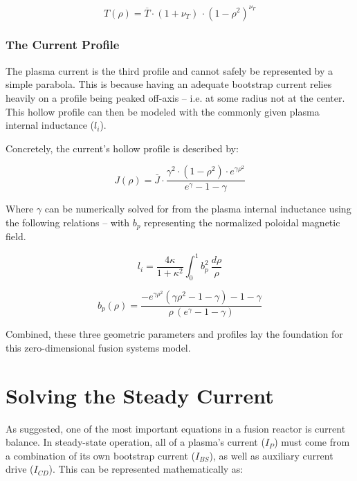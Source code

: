 \begin{equation}
	T(\rho) = \overline T \cdot ( 1 + \nu_T ) \, \cdot ( 1 - \rho ^ 2 ) ^ {\nu_T}
\end{equation}

\subsubsection{The Current Profile}

The plasma current is the third profile and cannot safely be represented by a simple parabola. This is because having an adequate bootstrap current relies heavily on a profile being peaked off-axis -- i.e. at some radius not at the center. This hollow profile can then be modeled with the commonly given plasma internal inductance ($l_i$).

Concretely, the current's hollow profile is described by:

\begin{equation}
	J(\rho) = \bar{J} \cdot \frac{ \gamma ^ 2 \cdot ( 1 - \rho ^ 2 ) \cdot e^{ \gamma \rho^2 } }{ e^\gamma - 1 - \gamma}
\end{equation}

Where $\gamma$ can be numerically solved for from the plasma internal inductance using the following relations -- with $b_p$ representing the normalized poloidal magnetic field.

\begin{equation}
	l_i = \frac{4 \kappa}{1+\kappa^2}	 \int_0^1 b_p^2 \ \frac{d\rho}{\rho}
\end{equation}

\begin{equation}
	\label{eq:b_p}
	b_p(\rho) = \frac{ -e^{\gamma\rho^2} ( \gamma\rho^2 - 1 - \gamma ) - 1 - \gamma }{\rho \,( e^\gamma - 1 - \gamma ) }
\end{equation}

Combined, these three geometric parameters and profiles lay the foundation for this zero-dimensional fusion systems model.

\section{Solving the Steady Current}

As suggested, one of the most important equations in a fusion reactor is current balance. In steady-state operation, all of a plasma's current ($I_P$) must come from a combination of its own bootstrap current ($I_{BS}$), as well as auxiliary current drive ($I_{CD}$). This can be represented mathematically as:

